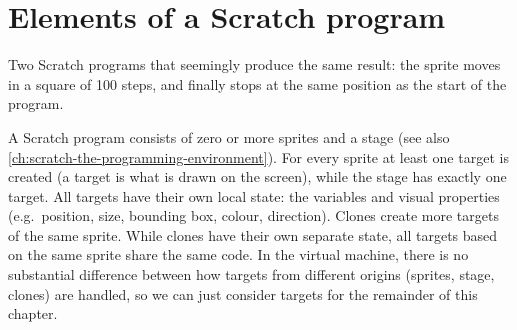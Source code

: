 \documentclass[../main]{subfiles}
\begin{document}
\section{Elements of a Scratch program}\label{sec:elements-of-a-scratch-program}

\begin{listing}
    \centering
    \begin{subfigure}{0.45\textwidth}
        \centering
        \begin{scratch}[scale=0.7]
        \end{scratch}
    \end{subfigure}
    \begin{subfigure}{0.45\textwidth}
        \centering
        \begin{scratch}[scale=0.7]
        \end{scratch}
    \end{subfigure}
    \caption{
        Two Scratch programs that seemingly produce the same result: the sprite moves in a square of 100 steps, and finally stops at the same position as the start of the program.
    }
    \label{lst:scratch-two-programs}
\end{listing}

A Scratch program consists of zero or more sprites and a stage (see also \cref{ch:scratch-the-programming-environment}).
For every sprite at least one target is created (a target is what is drawn on the screen), while the stage has exactly one target.
All targets have their own local state: the variables and visual properties (e.g.\ position, size, bounding box, colour, direction).
Clones create more targets of the same sprite.
While clones have their own separate state, all targets based on the same sprite share the same code.
In the virtual machine, there is no substantial difference between how targets from different origins (sprites, stage, clones) are handled, so we can just consider targets for the remainder of this chapter.
\end{document}
